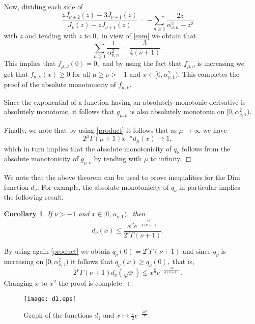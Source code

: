 \documentclass[journal]{IEEEtran}
\newtheorem{corollary}{Corollary}[theorem]
\begin{document}
Now, dividing each side of \cite[Lemma 4]{szasz}
$$\frac{zJ_{\nu+2}(z)-3J_{\nu+1}(z)}{J_{\nu}(z)-zJ_{\nu+1}(z)}
=-\sum_{n\geq1}\frac{2z}{\alpha_{\nu,n}^2-z^2}$$
with $z$ and tending with $z$ to $0,$ in view of \eqref{sum} we obtain that
$$\sum_{n\geq 1}\frac{1}{\alpha_{\nu,n}^2}=\frac{3}{4(\nu+1)}.$$
This implies that $f_{\mu,\nu}(0)=0,$ and by using the fact that $f_{\mu,\nu}$ is increasing we get that $f_{\mu,\nu}(x)\geq0$ for all $\mu\geq\nu>-1$ and $x\in[0,\alpha_{\nu,1}^2).$ This completes the proof of the absolute monotonicity of $f_{\mu,\nu}.$

Since the exponential of a function having an absolutely monotonic
derivative is absolutely monotonic, it follows that $g_{\mu,\nu}$ is also absolutely monotonic on $[0,\alpha_{\nu,1}^2).$

Finally, we note that by using \eqref{product} it follows that as $\mu\to \infty$ we have
$$2^{\mu}\Gamma(\mu+1)x^{-\mu}d_{\mu}(x)\to 1,$$ which in turn implies that the absolute monotonicity of $q_{\nu}$ follows from the absolute monotonicity of $g_{\mu,\nu}$ by tending with $\mu$ to infinity. \medskip \hfill $\Box$

We note that the above theorem can be used to prove inequalities for the Dini function $d_{\nu}.$ For example, the absolute monotonicity of $q_{\nu}$ in particular implies the following result.

\begin{corollary}
{\em If $\nu>-1$ and $x\in[0,\alpha_{\nu,1}),$ then
\begin{equation}\label{bound}d_{\nu}(x)\leq\frac{x^{\nu}e^{-\frac{3x^2}{4(\nu+1)}}}{2^{\nu}\Gamma(\nu+1)}.\end{equation}}
\end{corollary}

 By using again \eqref{product} we obtain $q_{\nu}(0)=2^{\nu}\Gamma(\nu+1)$ and since $q_{\nu}$ is increasing on $[0,\alpha_{\nu,1}^2)$ it follows that $q_{\nu}(x)\geq q_{\nu}(0),$ that is,
$$2^{\nu}\Gamma(\nu+1)d_{\nu}(\sqrt{x})\leq x^{\frac{\nu}{2}}e^{-\frac{3x}{4(\nu+1)}}.$$
Changing $x$ to $x^2$ the proof is complete. \medskip \hfill $\Box$

\begin{figure}[htb] \label{plot}
      \centering
        \scalebox{0.65}
        {\texttt{[image: d1.eps]}}
        \caption{Graph of the functions $d_1$ and $x\mapsto \frac{x}{2}e^{-\frac{3x^2}{8}}$.}
\end{figure}
\end{document}
